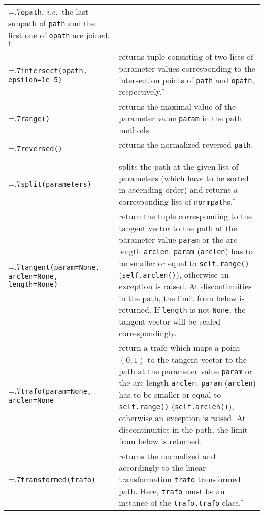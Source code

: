 \begin{tabularx}{1.04\linewidth}{>{\hsize=.7\hsize}X>{\raggedright\arraybackslash\hsize=1.3\hsize}X}
  \texttt{opath}, \textit{i.e.}\ the last subpath of \texttt{path}
  and the first one of \texttt{opath} are joined.$^\dagger$\\
  \texttt{intersect(opath, \newline\phantom{intersect(}epsilon=1e-5)}
  & returns tuple consisting of two lists of parameter values
  corresponding to the
  intersection points of \texttt{path} and \texttt{opath},
  respectively.$^\dagger$\\
  \texttt{range()} & returns the maximal value of the parameter value
  \texttt{param} in the path methods\\
  \texttt{reversed()} & returns the normalized reversed
  \texttt{path}.$^\dagger$\\
  \texttt{split(parameters)} & splits the path at the given list of
  parameters (which have to be sorted in ascending order) and returns
  a corresponding list of 
  \texttt{normpath}s.$^\dagger$\\
  \texttt{tangent(param=None, 
      \newline\phantom{tangent(}arclen=None,
      \newline\phantom{tangent(}length=None)} & return the tuple corresponding to
    the tangent vector to the path at the parameter value
  \texttt{param} or the arc length \texttt{arclen}.
    \texttt{param} (\texttt{arclen}) has to be
    smaller or equal to \texttt{self.range()} (\texttt{self.arclen()}), 
    otherwise an exception is raised.  At discontinuities in the path, the
    limit from below is returned. If \texttt{length} is not
    \texttt{None}, the tangent vector will be scaled correspondingly.
  \\
  \texttt{trafo(param=None, 
      \newline\phantom{trafo(}arclen=None} & return a trafo which maps 
    a point $(0, 1)$ to the tangent vector to the path at the parameter value
    \texttt{param} or the arc length \texttt{arclen}.
    \texttt{param} (\texttt{arclen}) has to be
    smaller or equal to \texttt{self.range()} (\texttt{self.arclen()}), 
    otherwise an exception is raised.  At discontinuities in the path, the
    limit from below is returned.
  \\
  \texttt{transformed(trafo)} & returns the normalized and accordingly
  to the linear transformation \texttt{trafo} transformed path. Here,
  \texttt{trafo} must be an instance of the \texttt{trafo.trafo}
  class.$^\dagger$
\end{tabularx} 
\medskip

